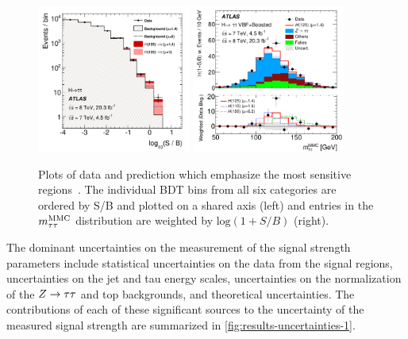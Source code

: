 \begin{figure}[tp]
  \centering
  \includegraphics[width=0.45\textwidth]{figures/HIGG-2013-32/fig_10}
  \includegraphics[width=0.45\textwidth]{figures/HIGG-2013-32/fig_11b}
  \caption{Plots of data and prediction which emphasize the most sensitive regions~\cite{HIGG-2013-32}. The individual BDT bins from all six categories are ordered by S/B and plotted on a shared axis (left) and entries in the $m_{\tau\tau}^\text{MMC}$ distribution are weighted by $\text{log}(1+S/B)$ (right).}
  \label{fig:results-money-plots}
\end{figure}

The dominant uncertainties on the measurement of the signal strength parameters include statistical uncertainties on the data from the signal regions, uncertainties on the jet and tau energy scales, uncertainties on the normalization of the $Z\rightarrow\tau\tau$ and top backgrounds, and theoretical uncertainties. The contributions of each of these significant sources to the uncertainty of the measured signal strength are summarized in \cref{fig:results-uncertainties-1}.

